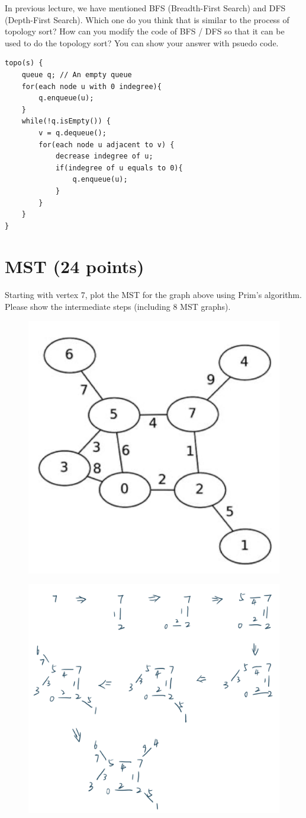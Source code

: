 \documentclass[11pt]{exam}
\begin{document}
In previous lecture, we have mentioned BFS (Breadth-First Search) and DFS (Depth-First Search). Which one do you think that is similar to the process of topology sort? How can you modify the code of BFS / DFS so that it can be used to do the topology sort? You can show your answer with psuedo code.

\begin{solution}
\begin{lstlisting}[]
topo(s) {
    queue q; // An empty queue 
    for(each node u with 0 indegree){
        q.enqueue(u);
    }
    while(!q.isEmpty()) {
        v = q.dequeue();
        for(each node u adjacent to v) {
            decrease indegree of u;
            if(indegree of u equals to 0){
                q.enqueue(u);
            }
        }
    }
}
\end{lstlisting}

\end{solution}
\newpage
\section{MST (24 points)}

Starting with vertex 7, plot the MST for the graph above using Prim’s algorithm.
Please show the intermediate steps (including 8 MST graphs).

\begin{figure}[htp]
\centering
\includegraphics[width=.4\linewidth]{mst.png}
\end{figure}

\begin{solution}
\begin{figure}[H]
    \centering
    \includegraphics[width=.7\linewidth]{1.png}
\end{figure}
\end{solution}
\end{document}
